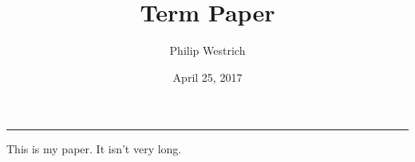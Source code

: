 \documentclass[12pt]{article}
\title{Term Paper}
\author{Philip Westrich}
\date{April 25, 2017}
\begin{document}
\maketitle

\vspace{-0.3in}
\noindent
\rule{\linewidth}{0.4pt}
\doublespacing

This is my paper. It isn't very long.
\end{document}
